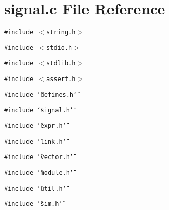 \section{signal.c File Reference}
\label{signal_8c}
{\tt \#include $<$string.h$>$}\par
{\tt \#include $<$stdio.h$>$}\par
{\tt \#include $<$stdlib.h$>$}\par
{\tt \#include $<$assert.h$>$}\par
{\tt \#include \char`\"{}defines.h\char`\"{}}\par
{\tt \#include \char`\"{}signal.h\char`\"{}}\par
{\tt \#include \char`\"{}expr.h\char`\"{}}\par
{\tt \#include \char`\"{}link.h\char`\"{}}\par
{\tt \#include \char`\"{}vector.h\char`\"{}}\par
{\tt \#include \char`\"{}module.h\char`\"{}}\par
{\tt \#include \char`\"{}util.h\char`\"{}}\par
{\tt \#include \char`\"{}sim.h\char`\"{}}\par
